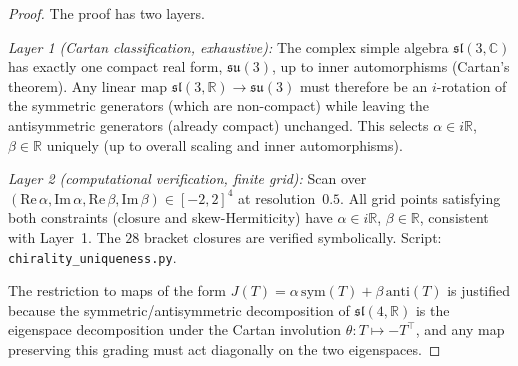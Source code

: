 \documentclass[11pt,a4paper]{article}
\theoremstyle{plain}
\theoremstyle{definition}
\theoremstyle{remark}
\begin{document}
\begin{proof}
The proof has two layers.

\emph{Layer 1 (Cartan classification, exhaustive):}
The complex simple algebra $\mathfrak{sl}(3,\mathbb{C})$ has exactly
one compact real form, $\mathfrak{su}(3)$, up to inner automorphisms
(Cartan's theorem).  Any linear map $\mathfrak{sl}(3,\mathbb{R}) \to
\mathfrak{su}(3)$ must therefore be an $i$-rotation of the symmetric
generators (which are non-compact) while leaving the antisymmetric
generators (already compact) unchanged.  This selects
$\alpha \in i\mathbb{R}$, $\beta \in \mathbb{R}$ uniquely (up to
overall scaling and inner automorphisms).

\emph{Layer 2 (computational verification, finite grid):}
Scan over $(\mathrm{Re}\,\alpha, \mathrm{Im}\,\alpha,
\mathrm{Re}\,\beta, \mathrm{Im}\,\beta) \in [-2,2]^4$ at
resolution~$0.5$.  All grid points satisfying both constraints
(closure and skew-Hermiticity) have $\alpha \in i\mathbb{R}$,
$\beta \in \mathbb{R}$, consistent with Layer~1.
The $28$ bracket closures are verified symbolically.
Script: \texttt{chirality\_uniqueness.py}.

The restriction to maps of the form
$J(T) = \alpha\,\mathrm{sym}(T) + \beta\,\mathrm{anti}(T)$
is justified because the symmetric/antisymmetric decomposition of
$\mathfrak{sl}(4,\mathbb{R})$ is the eigenspace decomposition under
the Cartan involution $\theta: T \mapsto -T^\top$, and any map
preserving this grading must act diagonally on the two eigenspaces.
\end{proof}
\end{document}
